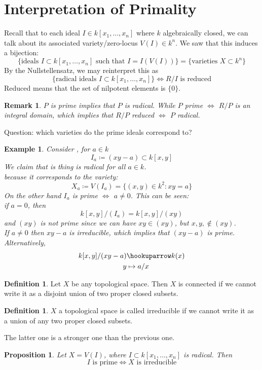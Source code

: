 \documentclass[12pt]{article}
\newtheorem{remark}[theorem]{Remark}
\newtheorem{prop}[theorem]{Proposition}
\newtheorem*{eg}{Example}
\theoremstyle{definition}
\newtheorem{definition}[theorem]{Definition}
\begin{document}
\section*{Interpretation of Primality}
Recall that to each ideal $I\in k[x_1,\dots,x_n]$ where $k$ algebraically closed, we can talk about its associated variety/zero-locus $V(I)\in k^n$. We saw that this induces a bijection:
\[
\{\text{ideals $I\subset k[x_1,\dots, x_n]$ such that $I=I(V(I))$}\} = \{\text{varieties $X\subset k^n$}\}
\]
By the Nullstellensatz, we may reinterpret this as
\[
\{\text{radical ideals $I\subset k[x_1,\dots,x_n]$}\} \iff R/I\text{ is reduced}
\]
Reduced means that the set of nilpotent elements is $\{0\}$.\\
\begin{remark}
$P$ is prime implies that $P$ is radical. While $P$ prime $\iff$ $R/P$ is an integral domain, which implies that $R/P$ reduced $\iff$ $P$ radical.
\end{remark}
Question: which varieties do the prime ideals correspond to?
\begin{eg}
Consider , for $a\in k$
\[
I_a \coloneqq (xy-a) \subset k[x,y]
\]
We claim that is thing is radical for all $a\in k$.\\
because it corresponds to the variety:
\[
X_a \coloneqq V(I_a) =\{(x,y)\in k^2: xy=a\}
\]
On the other hand $I_a$ is prime $\iff$ $a\neq 0$. This can be seen:\\
if $a=0$, then 
\[
k[x,y]/(I_a) = k[x,y]/(xy)
\]
and $(xy)$ is not prime since we can have $xy\in (xy)$, but $x,y, \notin (xy)$.\\
If $a\neq 0$ then $xy-a$ is irreducible, which implies that $(xy-a)$ is prime. Alternatively,
\begin{align*}
 k[x,y]/(xy-a) &\hookuparrow k(x)\\
y & \mapsto a/x
\end{align*}
\end{eg}
\begin{definition}
Let $X$ be any topological space. Then $X$ is connected if we cannot write it as a disjoint union of two proper closed subsets. 
\end{definition}
\begin{definition}
$X$ a topological space is called irreducible if we cannot write it as a union of any two proper closed subsets.
\end{definition}
The latter one is a stronger one than the previous one.
\begin{prop}
Let $X=V(I)$, where $I\subset k[x_1,\dots, x_n]$ is radical. Then
\[
I\text{ is prime} \iff X\text{ is irreducible}
\]
\end{prop}
\end{document}

